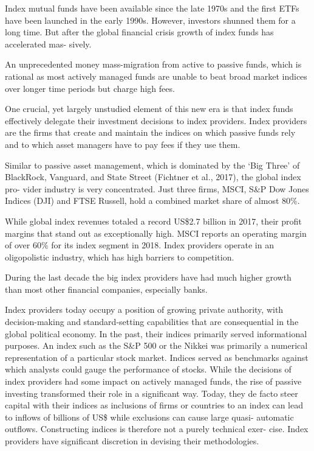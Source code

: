 \documentclass[
]{book}
\begin{document}
Index mutual funds have been available since the late 1970s and the first ETFs
have been launched in the early 1990s. However, investors shunned them for a long
time. But after the global financial crisis growth of index funds has accelerated mas-
sively.

An unprecedented
money mass-migration from active to passive funds, which is rational as most
actively managed funds are unable to beat broad market indices over longer time
periods but charge high fees.

One crucial, yet largely unstudied element of this new era is that
index funds effectively delegate their investment decisions to index providers. Index
providers are the firms that create and maintain the indices on which passive funds
rely and to which asset managers have to pay fees if they use them.

Similar to passive asset management, which is dominated by the `Big Three' of
BlackRock, Vanguard, and State Street (Fichtner et al., 2017), the global index pro-
vider industry is very concentrated. Just three firms, MSCI, S\&P Dow Jones Indices
(DJI) and FTSE Russell, hold a combined market share of almost 80\%.

While global index revenues totaled a record US\$2.7 billion in 2017,
their profit margins that stand out as exceptionally high.
MSCI reports an operating margin of over 60\% for its index segment in 2018.
Index providers operate in an oligopolistic industry,
which has high barriers to competition.

During the last decade the big index providers have had
much higher growth than most other financial companies, especially banks.

Index providers today occupy a position of growing
private authority, with decision-making and standard-setting capabilities that are
consequential in the global political economy. In the past, their indices primarily
served informational purposes. An index such as the S\&P 500 or the Nikkei was
primarily a numerical representation of a particular stock market. Indices served as
benchmarks against which analysts could gauge the performance of stocks. While
the decisions of index providers had some impact on actively managed funds, the
rise of passive investing transformed their role in a significant way. Today, they de
facto steer capital with their indices as inclusions of firms or countries to an
index can lead to inflows of billions of US\$ while exclusions can cause large quasi-
automatic outflows. Constructing indices is therefore not a purely technical exer-
cise. Index providers have significant discretion in devising their methodologies.
\end{document}
